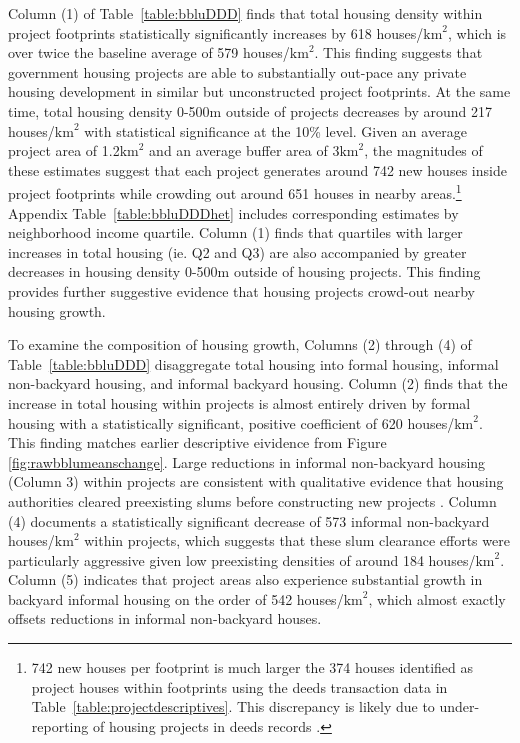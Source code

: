 \documentclass[12pt]{article}
\begin{document}
Column (1)  of Table~\ref{table:bbluDDD} finds that total housing density within project footprints statistically significantly increases by 618 houses/$\text{km}^{2}$, which is over twice the baseline average of 579 houses/$\text{km}^{2}$.  This finding suggests that government housing projects are able to substantially out-pace any private housing development in similar but unconstructed project footprints.  At the same time, total housing density 0-500m outside of projects decreases by around 217 houses/$\text{km}^{2}$ with statistical significance at the 10\% level.  Given an average project area of 1.2$\text{km}^{2}$ and an average buffer area of 3$\text{km}^{2}$, the magnitudes of these estimates suggest that each project generates around 742 new houses inside project footprints while crowding out around 651 houses in nearby areas.\footnote{742 new houses per footprint is much larger the 374 houses identified as project houses within footprints using the deeds transaction data in Table~\ref{table:projectdescriptives}.  This discrepancy is likely due to under-reporting of housing projects in deeds records \citep{seriq}.}  Appendix Table~\ref{table:bbluDDDhet} includes corresponding estimates by neighborhood income quartile.  Column (1) finds that quartiles with larger increases in total housing (ie. Q2 and Q3) are also accompanied by greater decreases in housing density 0-500m outside of housing projects.  This finding provides further suggestive evidence that housing projects crowd-out nearby housing growth.



To examine the composition of housing growth, Columns (2) through (4) of Table~\ref{table:bbluDDD} disaggregate total housing into formal housing, informal non-backyard housing, and informal backyard housing.  Column (2) finds that the increase in total housing within projects is almost entirely driven by formal housing with a statistically significant, positive coefficient of 620 houses/$\text{km}^{2}$.  This finding matches earlier descriptive eividence from Figure \ref{fig:rawbblumeanschange}.  Large reductions in informal non-backyard housing (Column 3) within projects are consistent with qualitative evidence that housing authorities cleared preexisting slums before constructing new projects \citep{hofmeyr2008risk}.  Column (4) documents a statistically significant decrease of 573 informal non-backyard houses/$\text{km}^{2}$ within projects, which suggests that these slum clearance efforts were particularly aggressive given low preexisting densities of around 184 houses/$\text{km}^{2}$.  Column (5) indicates that project areas also experience substantial growth in backyard informal housing on the order of 542 houses/$\text{km}^{2}$, which almost exactly offsets reductions in informal non-backyard houses.    
\end{document}
